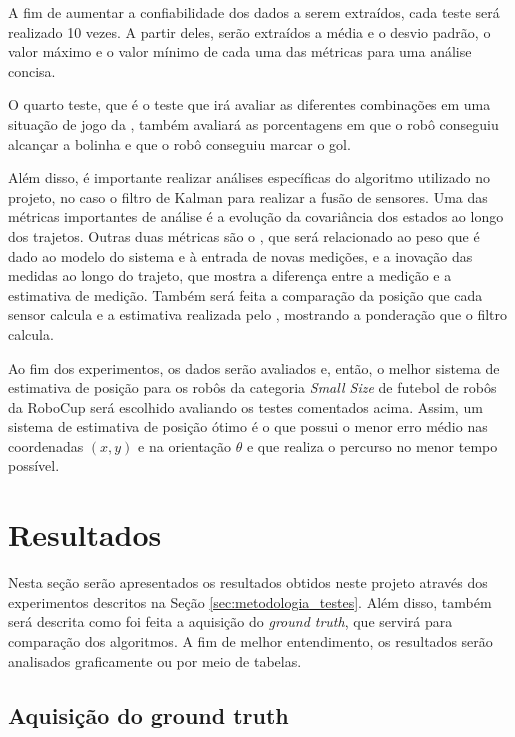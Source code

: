 \documentclass[acronym, symbols, table]{fei}
\begin{document}
		A fim de aumentar a confiabilidade dos dados a serem extraídos, cada teste será realizado 10 vezes. A partir deles, serão extraídos a média e o desvio padrão, o valor máximo e o valor mínimo de cada uma das métricas para uma análise concisa.
		
		O quarto teste, que é o teste que irá avaliar as diferentes combinações em uma situação de jogo da , também avaliará as porcentagens em que o robô conseguiu alcançar a bolinha e que o robô conseguiu marcar o gol.
		
		Além disso, é importante realizar análises específicas do algoritmo utilizado no projeto, no caso o filtro de Kalman para realizar a fusão de sensores. Uma das métricas importantes de análise é a evolução da covariância dos estados ao longo dos trajetos. Outras duas métricas são o , que será relacionado ao peso que é dado ao modelo do sistema e à entrada de novas medições, e a inovação das medidas ao longo do trajeto, que mostra a diferença entre a medição e a estimativa de medição. Também será feita a comparação da posição que cada sensor calcula e a estimativa realizada pelo , mostrando a ponderação que o filtro calcula.
		
		Ao fim dos experimentos, os dados serão avaliados e, então, o melhor sistema de estimativa de posição para os robôs da categoria \textit{Small Size} de futebol de robôs da RoboCup será escolhido avaliando os testes comentados acima. Assim, um sistema de estimativa de posição ótimo é o que possui o menor erro médio nas coordenadas $(x, y)$ e na orientação $\theta$ e que realiza o percurso no menor tempo possível.
		
	\chapter{Resultados}
	
		Nesta seção serão apresentados os resultados obtidos neste projeto através dos experimentos descritos na Seção \ref{sec:metodologia_testes}. Além disso, também será descrita como foi feita a aquisição do \textit{ground truth}, que servirá para comparação dos algoritmos. A fim de melhor entendimento, os resultados serão analisados graficamente ou por meio de tabelas.
		
		\section{Aquisição do ground truth} \label{sec:resultados_ground_truth}
		
\end{document}
